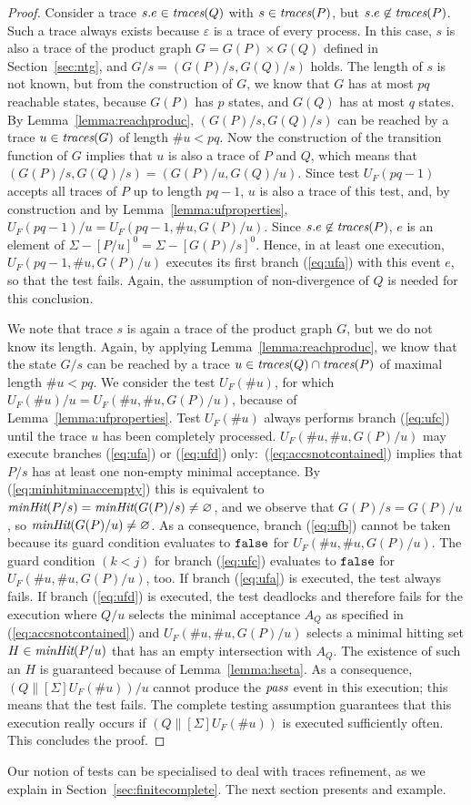 \begin{proof}
\medskip
{}
Consider a  trace $s.e\in\text{\it traces}(Q)$ with $s\in\text{\it traces}(P)$,
but $s.e\not\in\text{\it traces}(P)$. Such a trace always exists because $\varepsilon$ is
a trace of every process. In this case, $s$ is also a trace of the product
graph $G = G(P)\times G(Q)$ defined in Section~\ref{sec:ntg}, and $G/s =
(G(P)/s,G(Q)/s)$ holds. The length of $s$ is not known, but from the
construction of $G$,  we know that $G$ has at most $pq$ reachable states,
because $G(P)$ has $p$ states, and $G(Q)$ has at most $q$ states. By
Lemma~\ref{lemma:reachproduc}, $(G(P)/s,G(Q)/s)$ can be reached by a trace
$u\in\text{\it traces}(G)$ of length $\#u < pq$. Now the construction of the transition
function of $G$ implies that $u$ is also a trace of $P$ and $Q$, which means
that $(G(P)/s,G(Q)/s) = (G(P)/u,G(Q)/u)$. Since test $U_F(pq-1)$ accepts all
traces of $P$ up to length $pq-1$, $u$ is also a trace of this test, and, by
construction and by Lemma~\ref{lemma:ufproperties}, $U_F(pq-1)/u =
U_F(pq-1,\#u,G(P)/u)$. Since $s.e\not\in\text{\it traces}(P)$, $e$ is an element of
$\Sigma-[P/u]^0 = \Sigma - [G(P)/s]^0$. Hence, in at least one execution,
$U_F(pq-1,\#u,G(P)/u)$ executes its first branch (\ref{eq:ufa}) with this
event $e$, so that the test fails. Again, the assumption of non-divergence of
$Q$ is needed for this conclusion.

\medskip
{} We note that trace $s$ is again a trace of the
product graph $G$, but we do not know its length. Again, by applying
Lemma~\ref{lemma:reachproduc}, we know that the state $G/s$ can be reached by
a trace $u\in\text{\it traces}(Q)\cap\text{\it traces}(P)$ of maximal length $\#u < pq$. We consider
the test $U_F(\# u)$, for which $U_F(\# u)/u = U_F(\#u,\#u,G(P)/u)$, because
of Lemma~\ref{lemma:ufproperties}. Test $U_F(\#u)$  always performs branch
(\ref{eq:ufc}) until the trace $u$ has been completely processed.
 $U_F(\#u,\#u,G(P)/u)$ may execute branches (\ref{eq:ufa}) or (\ref{eq:ufd})
only:~(\ref{eq:accsnotcontained}) implies that $P/s$ has at least one
non-empty minimal acceptance. By (\ref{eq:minhitminaccempty}) this is
equivalent to $\text{\it minHit}(P/s) = \text{\it minHit}(G(P)/s)\neq\varnothing$, and we
observe that $G(P)/s = G(P)/u$, so $\text{\it minHit}(G(P)/u)\neq\varnothing$. As a
consequence, branch (\ref{eq:ufb}) cannot be taken because its guard
condition evaluates to $\mbox{{\tt false}}$  for $U_F(\#u,\#u,G(P)/u)$. The guard condition
$(k < j)$ for branch (\ref{eq:ufc}) evaluates to $\mbox{{\tt false}}$ for
$U_F(\#u,\#u,G(P)/u)$, too. If branch (\ref{eq:ufa}) is executed, the test
always fails. If branch (\ref{eq:ufd}) is executed, the test   deadlocks and
therefore fails for the execution where $Q/u$ selects the minimal acceptance
$A_Q$ as specified in (\ref{eq:accsnotcontained}) and $U_F(\#u,\#u,G(P)/u)$
selects a minimal hitting set $H\in\text{\it minHit}(P/u)$ that has an empty
intersection with $A_Q$. The existence of such an $H$ is guaranteed because
of Lemma~\ref{lemma:hseta}. As a consequence, $(Q\parallel[\Sigma]U_F(\#
u))/u$ cannot produce the ${\text{\it pass}}$ event in this execution; this means that
the test fails. The complete testing assumption guarantees that this
execution really occurs if $(Q\parallel[\Sigma]U_F(\# u))$ is executed
sufficiently often. This concludes the proof. \xbox
\end{proof}
%
Our notion of tests can be specialised to deal with traces refinement, as we
explain in Section~\ref{sec:finitecomplete}.
The next section presents and example.

